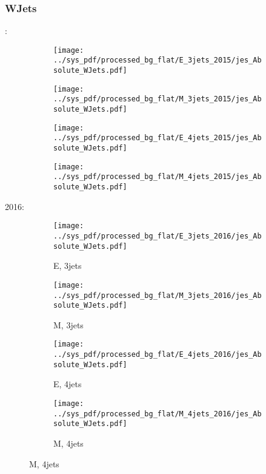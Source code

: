 \documentclass{beamer}
\begin{document}
\begin{frame}
\frametitle{WJets}
\fontsize{5}{1}:
\begin{figure}
\centering
\begin{subfigure}[b]{0.24\textwidth}
\texttt{[image: ../sys\_pdf/processed\_bg\_flat/E\_3jets\_2015/jes\_Absolute\_WJets.pdf]}
\end{subfigure}
\begin{subfigure}[b]{0.24\textwidth}
\texttt{[image: ../sys\_pdf/processed\_bg\_flat/M\_3jets\_2015/jes\_Absolute\_WJets.pdf]}
\end{subfigure}
\begin{subfigure}[b]{0.24\textwidth}
\texttt{[image: ../sys\_pdf/processed\_bg\_flat/E\_4jets\_2015/jes\_Absolute\_WJets.pdf]}
\end{subfigure}
\begin{subfigure}[b]{0.24\textwidth}
\texttt{[image: ../sys\_pdf/processed\_bg\_flat/M\_4jets\_2015/jes\_Absolute\_WJets.pdf]}
\end{subfigure}
\end{figure}
2016:
\begin{figure}
\centering
\begin{subfigure}[b]{0.24\textwidth}
\texttt{[image: ../sys\_pdf/processed\_bg\_flat/E\_3jets\_2016/jes\_Absolute\_WJets.pdf]}
\captionsetup{font=tiny}
\caption{E, 3jets}
\end{subfigure}
\begin{subfigure}[b]{0.24\textwidth}
\texttt{[image: ../sys\_pdf/processed\_bg\_flat/M\_3jets\_2016/jes\_Absolute\_WJets.pdf]}
\captionsetup{font=tiny}
\caption{M, 3jets}
\end{subfigure}
\begin{subfigure}[b]{0.24\textwidth}
\texttt{[image: ../sys\_pdf/processed\_bg\_flat/E\_4jets\_2016/jes\_Absolute\_WJets.pdf]}
\captionsetup{font=tiny}
\caption{E, 4jets}
\end{subfigure}
\begin{subfigure}[b]{0.24\textwidth}
\texttt{[image: ../sys\_pdf/processed\_bg\_flat/M\_4jets\_2016/jes\_Absolute\_WJets.pdf]}
\captionsetup{font=tiny}
\caption{M, 4jets}
\end{subfigure}
\end{figure}
\end{frame}
\end{document}
